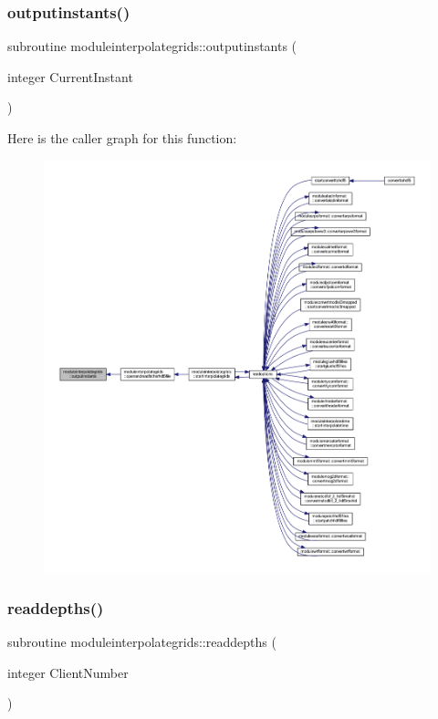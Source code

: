\subsubsection{\texorpdfstring{outputinstants()}{outputinstants()}}
{\footnotesize\ttfamily subroutine moduleinterpolategrids\+::outputinstants (\begin{DoxyParamCaption}\item[{integer}]{Current\+Instant }\end{DoxyParamCaption})\hspace{0.3cm}{\ttfamily [private]}}

Here is the caller graph for this function\+:\nopagebreak
\begin{figure}[H]
\begin{center}
\leavevmode
\includegraphics[width=350pt]{namespacemoduleinterpolategrids_a43f25c3ca1c96f174547603ebbf37ad0_icgraph}
\end{center}
\end{figure}
\mbox{\label{namespacemoduleinterpolategrids_a4e19db7f9940572fb986010ea9d64ec3}} 
\subsubsection{\texorpdfstring{readdepths()}{readdepths()}}
{\footnotesize\ttfamily subroutine moduleinterpolategrids\+::readdepths (\begin{DoxyParamCaption}\item[{integer}]{Client\+Number }\end{DoxyParamCaption})\hspace{0.3cm}{\ttfamily [private]}}

